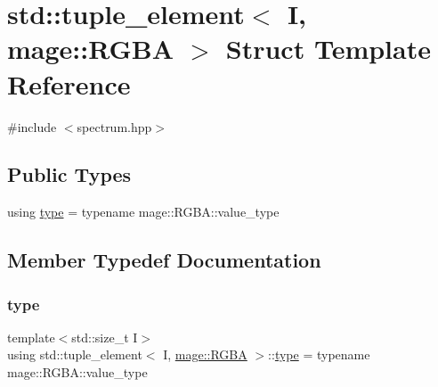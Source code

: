 \hypertarget{structstd_1_1tuple__element_3_01_i_00_01mage_1_1_r_g_b_a_01_4}{}\section{std\+:\+:tuple\+\_\+element$<$ I, mage\+:\+:R\+G\+BA $>$ Struct Template Reference}
\label{structstd_1_1tuple__element_3_01_i_00_01mage_1_1_r_g_b_a_01_4}


{\ttfamily \#include $<$spectrum.\+hpp$>$}

\subsection*{Public Types}
\begin{DoxyCompactItemize}
\item 
using \mbox{\hyperlink{structstd_1_1tuple__element_3_01_i_00_01mage_1_1_r_g_b_a_01_4_a22c2f400377cb726291cbecbf22151e4}{type}} = typename mage\+::\+R\+G\+B\+A\+::value\+\_\+type
\end{DoxyCompactItemize}


\subsection{Member Typedef Documentation}
\mbox{\label{structstd_1_1tuple__element_3_01_i_00_01mage_1_1_r_g_b_a_01_4_a22c2f400377cb726291cbecbf22151e4}} 
\subsubsection{\texorpdfstring{type}{type}}
{\footnotesize\ttfamily template$<$std\+::size\+\_\+t I$>$ \\
using std\+::tuple\+\_\+element$<$ I, \mbox{\hyperlink{structmage_1_1_r_g_b_a}{mage\+::\+R\+G\+BA}} $>$\+::\mbox{\hyperlink{structstd_1_1tuple__element_3_01_i_00_01mage_1_1_r_g_b_a_01_4_a22c2f400377cb726291cbecbf22151e4}{type}} =  typename mage\+::\+R\+G\+B\+A\+::value\+\_\+type}


